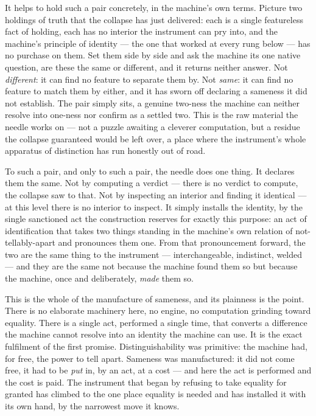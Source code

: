 It helps to hold such a pair concretely, in the machine's own terms. Picture two holdings of truth that the
collapse has just delivered: each is a single featureless fact of holding, each has no interior the instrument
can pry into, and the machine's principle of identity --- the one that worked at every rung below --- has no
purchase on them. Set them side by side and ask the machine its one native question, are
these the same or different, and it returns neither answer. Not \emph{different}: it can find no feature to
separate them by. Not \emph{same}: it can find no feature to match them by either, and it has sworn off declaring
a sameness it did not establish. The pair simply sits, a genuine two-ness the machine can neither resolve into
one-ness nor confirm as a settled two. This is the raw material the needle works on --- not a puzzle awaiting a
cleverer computation, but a residue the collapse guaranteed would be left over, a place where the instrument's
whole apparatus of distinction has run honestly out of road.

To such a pair, and only to such a pair, the needle does one thing. It declares them the same. Not by computing a
verdict --- there is no verdict to compute, the collapse saw to that. Not by inspecting an interior and finding it
identical --- at this level there is no interior to inspect. It simply installs the identity, by the single
sanctioned act the construction reserves for exactly this purpose: an act of identification that takes two
things standing in the machine's own relation of not-tellably-apart and pronounces them one. From that
pronouncement forward, the two are the same thing to the instrument --- interchangeable, indistinct, welded --- and
they are the same not because the machine found them so but because the machine, once and deliberately, \emph{made}
them so.

This is the whole of the manufacture of sameness, and its plainness is the point. There is no elaborate machinery
here, no engine, no computation grinding toward equality. There is a single act, performed a single time, that
converts a difference the machine cannot resolve into an identity the machine can use. It is the exact fulfilment
of the first promise. Distinguishability was primitive: the machine had, for free, the power to tell apart.
Sameness was manufactured: it did not come free, it had to be \emph{put} in, by an act, at a cost --- and here
the act is performed and the cost is paid. The
instrument that began by refusing to take equality for granted has climbed to the one place equality is needed
and has installed it with its own hand, by the narrowest move it knows.

